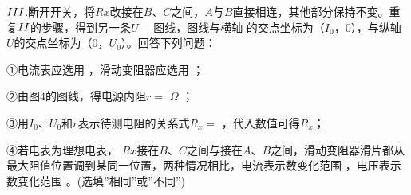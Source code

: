 \begin{enumerate}[leftmargin=0em]
$ \lmd{3} $.断开开关，将$ Rx $改接在$ B $、$ C $之间，$ A $与$ B $直接相连，其他部分保持不变。重复$ \lmd{2} $的步骤，得到另一条$ U $—  图线，图线与横轴  的交点坐标为（$ I_{0} $，$ 0 $），与纵轴$ U $的交点坐标为（$ 0 $，$ U_{0} $）。回答下列问题：

①电流表应选用  ，滑动变阻器应选用  ； 

②由图$ 4 $的图线，得电源内阻$ r= $  $ \Omega $ ；

③用$ I_{0} $、$ U_{0} $和$ r $表示待测电阻的关系式$ R_x= $  ，代入数值可得$ R_x $；

④若电表为理想电表， $ Rx $接在$ B $、$ C $之间与接在$ A $、$ B $之间，滑动变阻器滑片都从最大阻值位置调到某同一位置，两种情况相比，电流表示数变化范围  ，电压表示数变化范围 。(选填”相同”或”不同”)




\end{enumerate}

